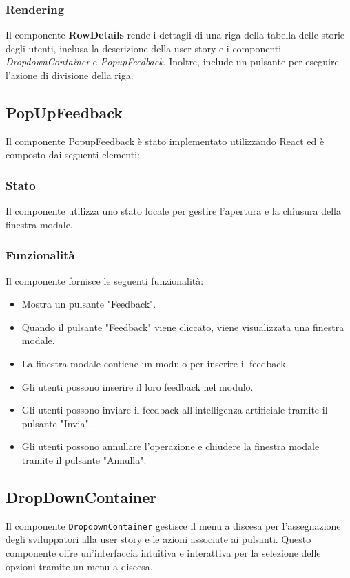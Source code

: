 \documentclass{article}
\begin{document}
\subsubsection*{Rendering}
Il componente \textbf{RowDetails} rende i dettagli di una riga della tabella delle storie degli utenti, inclusa la descrizione della user story e i componenti \textit{DropdownContainer} e \textit{PopupFeedback}. Inoltre, include un pulsante per eseguire l'azione di divisione della riga.

\subsection*{PopUpFeedback}
Il componente PopupFeedback è stato implementato utilizzando React ed è composto dai seguenti elementi:

\subsubsection*{Stato}
Il componente utilizza uno stato locale per gestire l'apertura e la chiusura della finestra modale.

\subsubsection*{Funzionalità}
Il componente fornisce le seguenti funzionalità:
\begin{itemize}
    \item Mostra un pulsante "Feedback".
    \item Quando il pulsante "Feedback" viene cliccato, viene visualizzata una finestra modale.
    \item La finestra modale contiene un modulo per inserire il feedback.
    \item Gli utenti possono inserire il loro feedback nel modulo.
    \item Gli utenti possono inviare il feedback all'intelligenza artificiale tramite il pulsante "Invia".
    \item Gli utenti possono annullare l'operazione e chiudere la finestra modale tramite il pulsante "Annulla".
\end{itemize}

\subsection*{DropDownContainer}
Il componente \texttt{DropdownContainer} gestisce il menu a discesa per l'assegnazione degli sviluppatori alla user story e le azioni associate ai pulsanti.
Questo componente offre un'interfaccia intuitiva e interattiva per la selezione delle opzioni tramite un menu a discesa.
\end{document}
